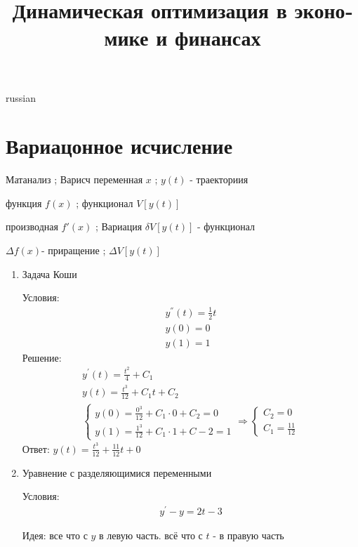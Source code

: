 \documentclass{article}
\begin{document}
\title{\foreignlanguage{russian}{Динамическая оптимизация в экономике и финансах}}
\maketitle

\begin{otherlanguage*}{russian}
\section{\foreignlanguage{russian}{Вариацонное исчисление}}
Матанализ ; Варисч
переменная $x$ ; $y(t)$ - траекториия

функция $f(x)$ ; функционал $V[y(t)]$ 

производная $f'(x)$ ; Вариация $\delta V[y(t)]$ - функционал 

$\Delta f(x) $- приращение ; $ \Delta V[y(t)] $

\begin{enumerate}

\item Задача Коши

Условия:
\begin{align}
y^{''}(t) = \frac{1}{2} t \\
y(0) = 0 \\
y(1) = 1 
\end{align}
Решение:
\begin{align}
y^{'} (t) = \frac{t^2}{4} + C_1 \\
y(t) = \frac{t^3}{12} + C_1 t + C_2 \\
\begin{cases}
y(0) = \frac{0^3}{12} + C_1 \cdot 0 + C_2 = 0 \\
y(1) = \frac{1^3}{12} + C_1 \cdot 1 + C-2 = 1 
\end{cases} \Rightarrow
\begin{cases}
C_2 = 0 \\
C_1 = \frac{11}{12}
\end{cases}
\end{align}
Ответ: $y(t) = \frac{t^3}{12} + \frac{11}{12} t + 0 $

\item Уравнение с разделяющимися переменными

Условия:
\begin{align}
y^{'} - y = 2 t - 3 
\end{align}

Идея: все что с $y$ в левую часть. всё что с $t$ - в правую часть


\end{enumerate}
\end{otherlanguage*}
\end{document}
